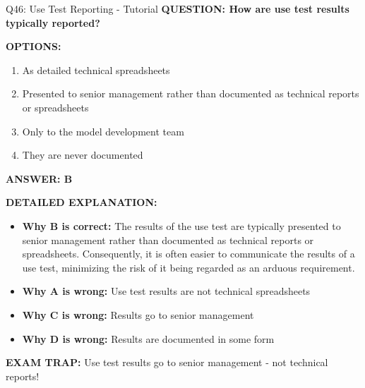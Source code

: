 \documentclass[8pt]{beamer}
\begin{document}
	\begin{frame}{Q46: Use Test Reporting - Tutorial}
		\fontsize{6.5}{7.5}\selectfont
		\textbf{QUESTION: How are use test results typically reported?}
		
		\vspace{0.1cm}
		\textbf{OPTIONS:}
		\begin{enumerate}
			\item As detailed technical spreadsheets
			\item Presented to senior management rather than documented as technical reports or spreadsheets
			\item Only to the model development team
			\item They are never documented
		\end{enumerate}
		
		\vspace{0.1cm}
		\textcolor{myblue}{\textbf{ANSWER: B}}
		
		\vspace{0.1cm}
		\textbf{DETAILED EXPLANATION:}
		\begin{itemize}
			\item \textbf{Why B is correct:} The results of the use test are typically presented to senior management rather than documented as technical reports or spreadsheets. Consequently, it is often easier to communicate the results of a use test, minimizing the risk of it being regarded as an arduous requirement.
			\item \textbf{Why A is wrong:} Use test results are not technical spreadsheets
			\item \textbf{Why C is wrong:} Results go to senior management
			\item \textbf{Why D is wrong:} Results are documented in some form
		\end{itemize}
		
		\textcolor{myred}{\textbf{EXAM TRAP:}} Use test results go to \textcolor{myblue}{senior management} - not technical reports!
	\end{frame}
	
\end{document}
